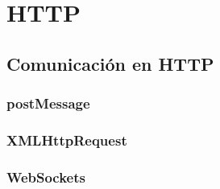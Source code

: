 \section{HTTP}
\label{chap:HTTP}

\subsection{Comunicación en HTTP}
\label{chap:comunHTTP}

\subsubsection{postMessage}
\label{chap:postmessage}

\subsubsection{XMLHttpRequest}
\label{XMLHR}

\subsubsection{WebSockets}
\label{WebSockets}

